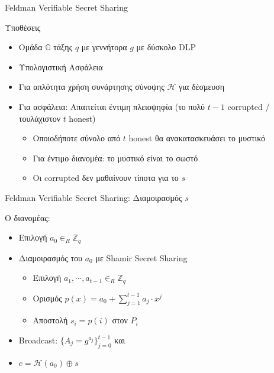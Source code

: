 \documentclass[handout]{beamer}
\begin{document}
\begin{frame}{Feldman Verifiable Secret Sharing}
\begin{block}{Υποθέσεις}
	\begin{itemize}
		\item Ομάδα $\mathbb{G}$ τάξης $q$ με γεννήτορα $g$ με δύσκολο DLP \pause
		\item Υπολογιστική Ασφάλεια \pause
		\item Για απλότητα χρήση συνάρτησης σύνοψης $\mathcal{H}$ για δέσμευση \pause
		\item Για ασφάλεια: Απαιτείται έντιμη πλειοψηφία (το πολύ $t-1$ corrupted / τουλάχιστον $t$ honest) \pause
		\begin{itemize}
			\item Οποιοδήποτε σύνολο από $t$ honest θα ανακατασκευάσει το μυστικό
			\item Για έντιμο διανομέα: το μυστικό είναι το σωστό
			\item Οι corrupted δεν μαθαίνουν τίποτα για το $s$
		\end{itemize}
 	\end{itemize}
\end{block}
\end{frame}

\begin{frame}{Feldman Verifiable Secret Sharing: Διαμοιρασμός $s$}
\begin{block}{Ο διανομέας:}
	\begin{itemize}
		\item Επιλογή $a_0 \in_R \mathbb{Z}_q$ \pause
		\item Διαμοιρασμός του $a_0$ με Shamir Secret Sharing \pause
		\begin{itemize}
				\item Επιλογή $a_1, \cdots, a_{t-1} \in_R \mathbb{Z}_q$
				\item Ορισμός $p(x) = a_0+\sum_{j=1}^{t-1} a_j \cdot x^j$
				\item Αποστολή $s_i = p(i)$ στον $P_i$
		\end{itemize} \pause
		\item Broadcast: $\{ A_j = g^{a_j} \}_{j=0}^{t-1}$ και
		\item $c = \mathcal{H}(a_0) \oplus s$
		\end{itemize}
\end{block}
\end{frame}
\end{document}
